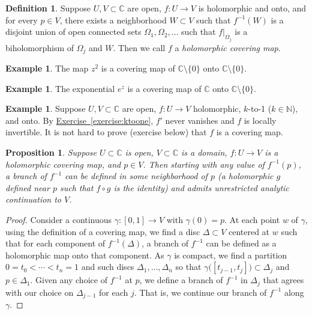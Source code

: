 \documentclass[12pt,openany]{book}
\newcommand{\C}{{\mathbb{C}}}
\newcommand{\N}{{\mathbb{N}}}
\newcommand{\myindex}[1]{#1\index{#1}}
\theoremstyle{plain}
\newtheorem{prop}[thm]{Proposition}
\theoremstyle{remark}
\theoremstyle{definition}
\newtheorem{defn}[thm]{Definition}
\theoremstyle{exercise}
\theoremstyle{example}
\newtheorem{example}[thm]{Example}
\newcommand{\exerciseref}[1]{\hyperref[#1]{Exercise~\ref*{#1}}}
\begin{document}
\begin{defn}
Suppose $U,V \subset \C$ are open, $f \colon U \to V$ is holomorphic
and onto, and for every $p \in V$, there exists a neighborhood $W \subset
V$ such that $f^{-1}(W)$ is a disjoint union of open connected sets
$\Omega_1,\Omega_2,\ldots$ such that $f|_{\Omega_j}$ is a biholomorphism of
$\Omega_j$ and $W$.
Then we call $f$ a \emph{\myindex{holomorphic covering map}}.
\end{defn}

\begin{example}
The map $z^2$ is a covering map of $\C \setminus \{ 0 \}$ onto $\C \setminus \{ 0 \}$.
\end{example}

\begin{example}
The exponential $e^z$ is a covering map of $\C$ onto $\C \setminus \{ 0 \}$.
\end{example}

\begin{example}
Suppose $U,V \subset \C$ are open, $f \colon U \to V$ holomorphic, $k$-to-1
($k \in \N$), and onto.
By \exerciseref{exercise:ktoone}, $f'$ never vanishes and
$f$ is locally invertible.  It is not hard to
prove (exercise below) that $f$ is a covering map.
\end{example}

\begin{prop}
Suppose $U \subset \C$ is open, $V \subset \C$ is a domain,
$f \colon U \to V$ is a holomorphic covering map, and $p \in V$.
Then starting with any value of $f^{-1}(p)$, a branch of $f^{-1}$
can be defined in some neighborhood
of $p$ (a holomorphic $g$ defined near $p$ such that $f \circ g$ is the
identity) and admits unrestricted analytic continuation to $V$.
\end{prop}

\begin{proof}
Consider a continuous $\gamma \colon [0,1] \to V$ with $\gamma(0) = p$.
At each point $w$ of $\gamma$, using the definition of a covering map,
we find a disc $\Delta \subset V$ centered at $w$ such that
for each component of 
$f^{-1}(\Delta)$, a branch of $f^{-1}$ can be defined as a
holomorphic map onto that component.  As $\gamma$ is compact, we
find a partition $0 = t_0 < \cdots < t_n = 1$ and
such discs $\Delta_1,\ldots,\Delta_n$ so that
$\gamma\bigl([t_{j-1},t_j]\bigr) \subset \Delta_j$
and $p \in \Delta_1$.  Given any choice
of $f^{-1}$ at $p$, we define a branch of $f^{-1}$ in $\Delta_j$
that agrees with
our choice on $\Delta_{j-1}$ for each $j$.
That is, we continue our branch of $f^{-1}$
along $\gamma$.
\end{proof}
\end{document}
